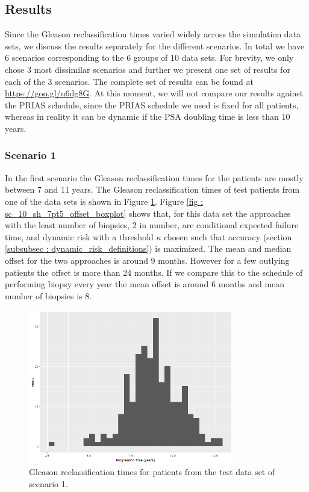 \subsection{Results}
Since the Gleason reclassification times varied widely across the simulation data sets, we discuss the results separately for the different scenarios. In total we have 6 scenarios corresponding to the 6 groups of 10 data sets. For brevity, we only chose 3 most dissimilar scenarios and further we present one set of results for each of the 3 scenarios. The complete set of results can be found at \url{https://goo.gl/u6dg8G}. At this moment, we will not compare our results against the PRIAS schedule, since the PRIAS schedule we used is fixed for all patients, whereas in reality it can be dynamic if the PSA doubling time is less than 10 years.

\subsubsection{Scenario 1}
In the first scenario the Gleason reclassification times for the patients are mostly between 7 and 11 years. The Gleason reclassification times of test patients from one of the data sets is shown in Figure \ref{fig : sc_10_sh_7pt5_progression_hist}. Figure \ref{fig : sc_10_sh_7pt5_offset_boxplot} shows that, for this data set the approaches with the least number of biopsies, 2 in number, are conditional expected failure time, and dynamic risk with a threshold $\kappa$ chosen such that accuracy (section \ref{subsubsec : dynamic_risk_definitions}) is maximized. The mean and median offset for the two approaches is around 9 months. However for a few outlying patients the offset is more than 24 months. If we compare this to the schedule of performing biopsy every year the mean offset is around 6 months and mean number of biopsies is 8. 

\begin{figure}[H]
\centering
\captionsetup{justification=centering}
\includegraphics[width=0.8\textwidth]{sim_study_res_sc_10_sh_7pt5/progression_hist.png}
\caption{\label{fig : sc_10_sh_7pt5_progression_hist} Gleason reclassification times for patients from the test data set of scenario 1.}
\end{figure}

